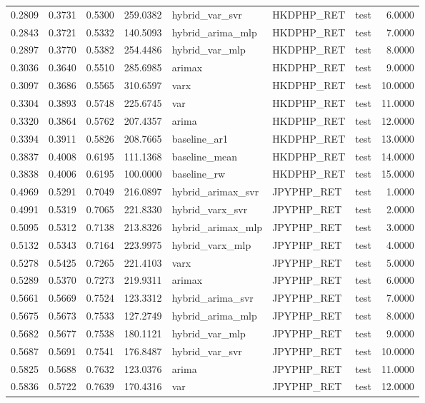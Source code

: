 \begin{tabular}{rrrrlllr}
0.2809 & 0.3731 & 0.5300 & 259.0382 & hybrid_var_svr & HKDPHP_RET & test & 6.0000 \\
0.2843 & 0.3721 & 0.5332 & 140.5093 & hybrid_arima_mlp & HKDPHP_RET & test & 7.0000 \\
0.2897 & 0.3770 & 0.5382 & 254.4486 & hybrid_var_mlp & HKDPHP_RET & test & 8.0000 \\
0.3036 & 0.3640 & 0.5510 & 285.6985 & arimax & HKDPHP_RET & test & 9.0000 \\
0.3097 & 0.3686 & 0.5565 & 310.6597 & varx & HKDPHP_RET & test & 10.0000 \\
0.3304 & 0.3893 & 0.5748 & 225.6745 & var & HKDPHP_RET & test & 11.0000 \\
0.3320 & 0.3864 & 0.5762 & 207.4357 & arima & HKDPHP_RET & test & 12.0000 \\
0.3394 & 0.3911 & 0.5826 & 208.7665 & baseline_ar1 & HKDPHP_RET & test & 13.0000 \\
0.3837 & 0.4008 & 0.6195 & 111.1368 & baseline_mean & HKDPHP_RET & test & 14.0000 \\
0.3838 & 0.4006 & 0.6195 & 100.0000 & baseline_rw & HKDPHP_RET & test & 15.0000 \\
0.4969 & 0.5291 & 0.7049 & 216.0897 & hybrid_arimax_svr & JPYPHP_RET & test & 1.0000 \\
0.4991 & 0.5319 & 0.7065 & 221.8330 & hybrid_varx_svr & JPYPHP_RET & test & 2.0000 \\
0.5095 & 0.5312 & 0.7138 & 213.8326 & hybrid_arimax_mlp & JPYPHP_RET & test & 3.0000 \\
0.5132 & 0.5343 & 0.7164 & 223.9975 & hybrid_varx_mlp & JPYPHP_RET & test & 4.0000 \\
0.5278 & 0.5425 & 0.7265 & 221.4103 & varx & JPYPHP_RET & test & 5.0000 \\
0.5289 & 0.5370 & 0.7273 & 219.9311 & arimax & JPYPHP_RET & test & 6.0000 \\
0.5661 & 0.5669 & 0.7524 & 123.3312 & hybrid_arima_svr & JPYPHP_RET & test & 7.0000 \\
0.5675 & 0.5673 & 0.7533 & 127.2749 & hybrid_arima_mlp & JPYPHP_RET & test & 8.0000 \\
0.5682 & 0.5677 & 0.7538 & 180.1121 & hybrid_var_mlp & JPYPHP_RET & test & 9.0000 \\
0.5687 & 0.5691 & 0.7541 & 176.8487 & hybrid_var_svr & JPYPHP_RET & test & 10.0000 \\
0.5825 & 0.5688 & 0.7632 & 123.0376 & arima & JPYPHP_RET & test & 11.0000 \\
0.5836 & 0.5722 & 0.7639 & 170.4316 & var & JPYPHP_RET & test & 12.0000 \\

\end{tabular}
